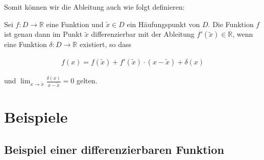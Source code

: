 \documentclass[fontsize=9pt,
               parskip=half-,
               DIV=14,
               listof=chapterentry,
               tocflat]{scrbook}
\begin{document}
Somit können wir die Ableitung auch wie folgt definieren:

\begin{definition*}
Sei $f:D\to \mathbb {R} $ eine Funktion und ${\tilde {x}}\in D$ ein Häufungspunkt von $D$. Die Funktion $f$ ist genau dann im Punkt ${\tilde {x}}$ differenzierbar mit der Ableitung $f'({\tilde {x}})\in \mathbb {R} $, wenn eine Funktion $\delta :D\to \mathbb {R} $ existiert, so dass

\begin{align*}
f(x)=f({\tilde {x}})+f'({\tilde {x}})\cdot (x-{\tilde {x}})+\delta (x)
\end{align*}

und $\lim _{x\to {\tilde {x}}}{\tfrac {\delta (x)}{x-{\tilde {x}}}}=0$ gelten.

\end{definition*}
\clearpage
\section{Beispiele}

\subsection{Beispiel einer differenzierbaren Funktion}
\end{document}
